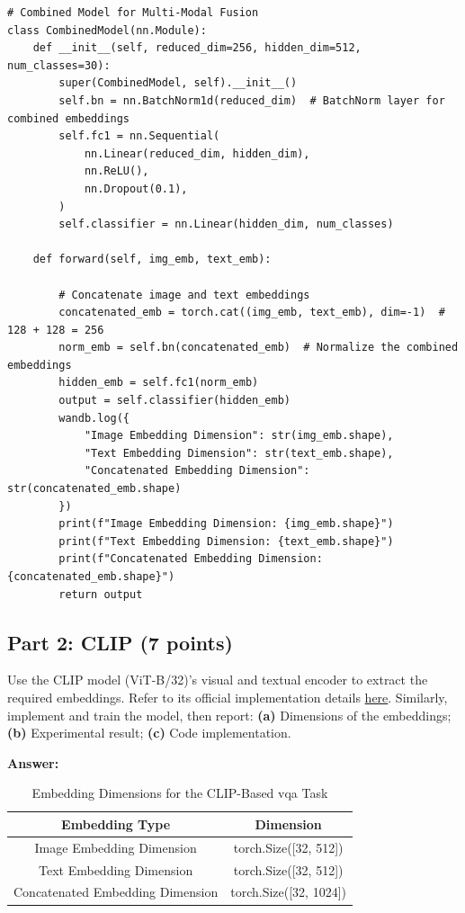 \documentclass[11pt, oneside]{article}   	%
\begin{document}
\begin{verbatim}
# Combined Model for Multi-Modal Fusion
class CombinedModel(nn.Module):
    def __init__(self, reduced_dim=256, hidden_dim=512, num_classes=30):
        super(CombinedModel, self).__init__()
        self.bn = nn.BatchNorm1d(reduced_dim)  # BatchNorm layer for combined embeddings
        self.fc1 = nn.Sequential(
            nn.Linear(reduced_dim, hidden_dim),
            nn.ReLU(),
            nn.Dropout(0.1),
        )
        self.classifier = nn.Linear(hidden_dim, num_classes)

    def forward(self, img_emb, text_emb):

        # Concatenate image and text embeddings
        concatenated_emb = torch.cat((img_emb, text_emb), dim=-1)  # 128 + 128 = 256
        norm_emb = self.bn(concatenated_emb)  # Normalize the combined embeddings
        hidden_emb = self.fc1(norm_emb)
        output = self.classifier(hidden_emb)
        wandb.log({
            "Image Embedding Dimension": str(img_emb.shape),
            "Text Embedding Dimension": str(text_emb.shape),
            "Concatenated Embedding Dimension": str(concatenated_emb.shape)
        })
        print(f"Image Embedding Dimension: {img_emb.shape}")
        print(f"Text Embedding Dimension: {text_emb.shape}")
        print(f"Concatenated Embedding Dimension: {concatenated_emb.shape}")
        return output
\end{verbatim}


\subsection*{Part 2: CLIP (7 points)}
 Use the CLIP model (ViT-B/32)'s visual and textual encoder to extract the required embeddings. Refer to its official implementation details \href{https://github.com/openai/CLIP}{here}. Similarly, implement and train the model, then report: \textbf{(a)} Dimensions of the embeddings; \textbf{(b)} Experimental result; \textbf{(c)} Code implementation.

\textbf{Answer:} \\

\begin{table}[H]
    \centering
    \begin{tabular}{|c|c|}
    \hline
    \textbf{Embedding Type}         & \textbf{Dimension}      \\ \hline
    Image Embedding Dimension       & torch.Size([32, 512])   \\ \hline
    Text Embedding Dimension        & torch.Size([32, 512])   \\ \hline
    Concatenated Embedding Dimension & torch.Size([32, 1024])  \\ \hline
    \end{tabular}
    \caption{Embedding Dimensions for the CLIP-Based vqa Task}
    \label{table:clip_embedding_dimensions}
\end{table}
\end{document}
